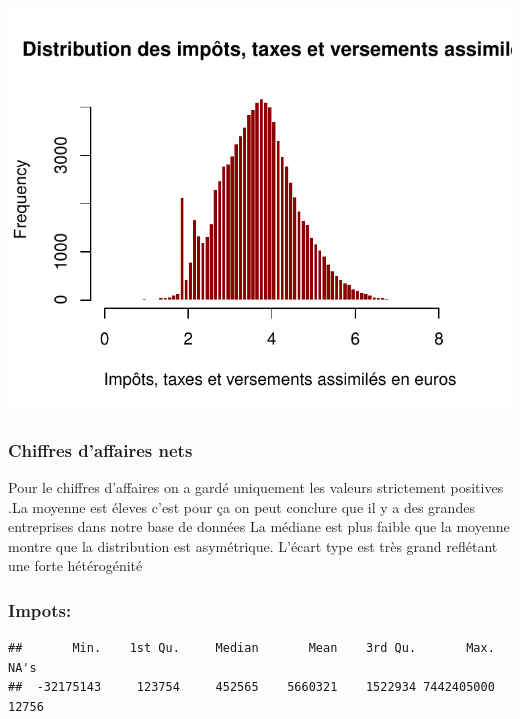 \documentclass[mstat,12pt]{unswthesis}
\begin{document}
\includegraphics{scdon2-UPV-report-template_sansPython_files/figure-latex/unnamed-chunk-30-1.pdf}

\medskip

\subsubsection{Chiffres d'affaires nets}\label{chiffres-daffaires-nets}

\medskip

Pour le chiffres d'affaires on a gardé uniquement les valeurs
strictement positives .La moyenne est éleves c'est pour ça on peut
conclure que il y a des grandes entreprises dans notre base de données
La médiane est plus faible que la moyenne montre que la distribution est
asymétrique. L'écart type est très grand reflétant une forte
hétérogénité

\medskip

\subsubsection{Impots:}\label{impots}

\medskip

\scriptsize

\begin{verbatim}
##       Min.    1st Qu.     Median       Mean    3rd Qu.       Max.       NA's 
##  -32175143     123754     452565    5660321    1522934 7442405000      12756
\end{verbatim}

\normalsize
\end{document}
